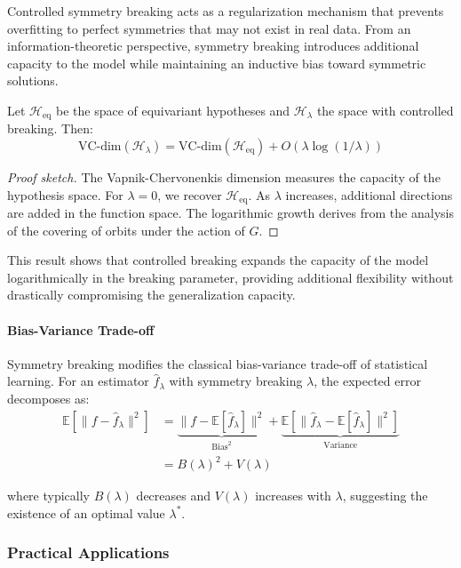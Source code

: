 Controlled symmetry breaking acts as a regularization mechanism that prevents overfitting to perfect symmetries that may not exist in real data. From an information-theoretic perspective, symmetry breaking introduces additional capacity to the model while maintaining an inductive bias toward symmetric solutions.

\begin{theorem}
Let $\mathcal{H}_{\text{eq}}$ be the space of equivariant hypotheses and $\mathcal{H}_{\lambda}$ the space with controlled breaking. Then:
\[\text{VC-dim}(\mathcal{H}_{\lambda}) = \text{VC-dim}(\mathcal{H}_{\text{eq}}) + O(\lambda \log(1/\lambda))\]
\end{theorem}

\begin{proof}[Proof sketch]
The Vapnik-Chervonenkis dimension measures the capacity of the hypothesis space. For $\lambda = 0$, we recover $\mathcal{H}_{\text{eq}}$. As $\lambda$ increases, additional directions are added in the function space. The logarithmic growth derives from the analysis of the covering of orbits under the action of $G$.
\end{proof}

This result shows that controlled breaking expands the capacity of the model logarithmically in the breaking parameter, providing additional flexibility without drastically compromising the generalization capacity.

\paragraph{Bias-Variance Trade-off}

Symmetry breaking modifies the classical bias-variance trade-off of statistical learning. For an estimator $\hat{f}_\lambda$ with symmetry breaking $\lambda$, the expected error decomposes as:
\begin{align}
\mathbb{E}[\|f - \hat{f}_\lambda\|^2] &= \underbrace{\|f - \mathbb{E}[\hat{f}_\lambda]\|^2}_{\text{Bias}^2} + \underbrace{\mathbb{E}[\|\hat{f}_\lambda - \mathbb{E}[\hat{f}_\lambda]\|^2]}_{\text{Variance}} \\
&= B(\lambda)^2 + V(\lambda)
\end{align}

where typically $B(\lambda)$ decreases and $V(\lambda)$ increases with $\lambda$, suggesting the existence of an optimal value $\lambda^*$.

\subsubsection{Practical Applications}

